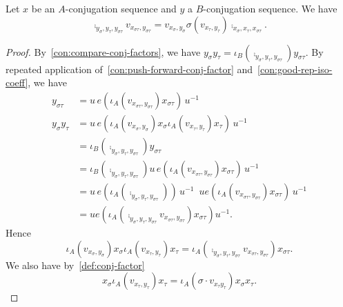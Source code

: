 \begin{lemma}\label{lem:compare-to-2-cocycle-aux}
  Let $x$ be an $A$-conjugation sequence and $y$ a $B$-conjugation sequence.
  We have
  \[
    \comp_{y_{\sigma}, y_{\tau}, y_{\sigma\tau}} v_{x_{\sigma\tau},y_{\sigma\tau}} = v_{x_{\sigma},y_{\sigma}} \sigma\left(v_{x_{\tau},y_{\tau}}\right) \comp_{x_{\sigma},x_{\tau},x_{\sigma\tau}}.
  \]
  \leanok
\end{lemma}
\begin{proof}
  By~\cref{con:compare-conj-factors}, we have $y_{\sigma}y_{\tau} = \iota_{B}\left(\comp_{y_{\sigma},y_{\tau},y_{\sigma\tau}}\right)y_{\sigma\tau}$.
  By repeated application of~\cref{con:push-forward-conj-factor} and~\cref{con:good-rep-iso-coeff}, we have
  \[
    \begin{aligned}
      y_{\sigma\tau}&= u\,e\left(\iota_{A}\left(v_{x_{\sigma\tau},y_{\sigma\tau}}\right)x_{\sigma\tau}\right)\,u^{-1}\\
      y_{\sigma}y_{\tau} &= u\,e\left(\iota_{A}\left(v_{x_{\sigma},y_{\sigma}}\right)x_{\sigma}\iota_{A}\left(v_{x_{\tau},y_{\tau}}\right)x_{\tau}\right)\,u^{-1}\\
                    &= \iota_{B}\left(\comp_{y_{\sigma},y_{\tau},y_{\sigma\tau}}\right)y_{\sigma\tau}\\
                    &= \iota_{B}\left(\comp_{y_{\sigma},y_{\tau},y_{\sigma\tau}}\right)u\,e\left(\iota_{A}\left(v_{x_{\sigma\tau},y_{\sigma\tau}}\right)x_{\sigma\tau}\right)\,u^{-1}\\
                    &= u\,e\left(\iota_{A}\left(\comp_{y_{\sigma},y_{\tau},y_{\sigma\tau}}\right)\right)\,u^{-1}\,\,\,ue\left(\iota_{A}\left(v_{x_{\sigma\tau},y_{\sigma\tau}}\right)x_{\sigma\tau}\right)\,u^{-1}\\
      &= ue\left(\iota_{A}\left(\comp_{y_{\sigma},y_{\tau},y_{\sigma\tau}}v_{x_{\sigma\tau},y_{\sigma\tau}}\right)x_{\sigma\tau}\right)u^{-1}.
    \end{aligned}
  \]
  Hence
  \[
    \iota_{A}\left(v_{x_{\sigma},y_{\sigma}}\right)x_{\sigma}\iota_{A}\left(v_{x_{\tau},y_{\tau}}\right)x_{\tau} = \iota_{A}\left(\comp_{y_{\sigma},y_{\tau},y_{\sigma\tau}}v_{x_{\sigma\tau},y_{\sigma\tau}}\right)x_{\sigma\tau}.
  \]
  We also have by~\cref{def:conj-factor}
  \[
    x_{\sigma} \iota_{A}\left(v_{x_{\tau},y_{\tau}}\right) x_{\tau} =
    \iota_{A}\left(\sigma\cdot v_{x_{\tau}y_{\tau}}\right) x_{\sigma}x_{\tau}.
\]
\end{proof}

